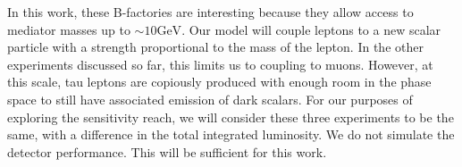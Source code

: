 In this work, these B-factories are interesting because they allow access to mediator masses up to $\sim 10\textrm{GeV}$.
Our model will couple leptons to a new scalar particle with a strength proportional to the mass of the lepton.
In the other experiments discussed so far, this limits us to coupling to muons.
However, at this scale, tau leptons are copiously produced with enough room in the phase space to still have associated emission of dark scalars.
For our purposes of exploring the sensitivity reach, we will consider these three experiments to be the same, with a difference in the total integrated luminosity.
We do not simulate the detector performance.
This will be sufficient for this work.
